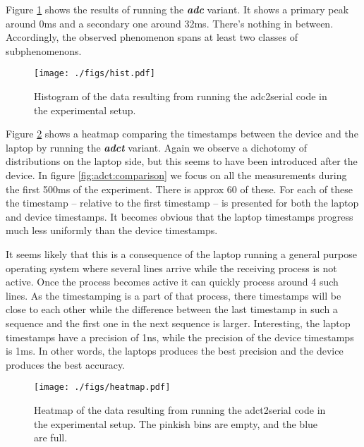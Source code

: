 \documentclass[a4paper]{article}
\newcommand{\textdesc}[1]{\textit{\textbf{#1}}}
\begin{document}
Figure \ref{fig:adc:result} shows the results of running the \textdesc{adc} variant. It shows a primary peak around 0ms and a secondary one around 32ms. There's nothing in between. Accordingly, the observed phenomenon spans at least two classes of subphenomenons.

\begin{figure}[btp]
  \begin{center}
    \texttt{[image: ./figs/hist.pdf]}
  \end{center}
  \caption{\label{fig:adc:result} Histogram of the data resulting from running the adc2serial code in the experimental setup.}
\end{figure}

Figure \ref{fig:adct:heatmap} shows a heatmap comparing the timestamps between the device and the laptop by running the \textdesc{adct} variant. Again we observe a dichotomy of distributions on the laptop side, but this seems to have been introduced after the device. In figure \ref{fig:adct:comparison} we focus on all the measurements during the first 500ms of the experiment. There is approx 60 of these. For each of these the timestamp -- relative to the first timestamp -- is presented for both the laptop and device timestamps. It becomes obvious that the laptop timestamps progress much less uniformly than the device timestamps.

It seems likely that this is a consequence of the laptop running a general purpose operating system where several lines arrive while the receiving process is not active. Once the process becomes active it can quickly process around 4 such lines. As the timestamping is a part of that process, there timestamps will be close to each other while the difference between the last timestamp in such a sequence and the first one in the next sequence is larger. Interesting, the laptop timestamps have a precision of 1ns, while the precision of the device timestamps is 1ms. In other words, the laptops produces the best precision and the device produces the best accuracy.

\begin{figure}[btp]
  \begin{center}
    \texttt{[image: ./figs/heatmap.pdf]}
  \end{center}
  \caption{\label{fig:adct:heatmap} Heatmap of the data resulting from running the adct2serial code in the experimental setup. The pinkish bins are empty, and the blue are full.}
\end{figure}
\end{document}
